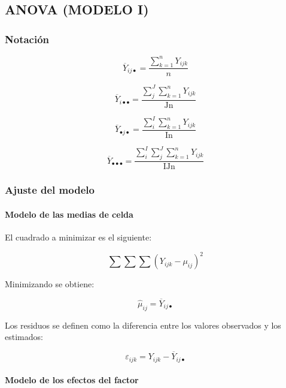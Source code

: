 \documentclass[]{book}
\let\oldparagraph\paragraph
\renewcommand{\paragraph}[1]{\oldparagraph{#1}\mbox{}}
\theoremstyle{definition}
\theoremstyle{definition}
\theoremstyle{definition}
\theoremstyle{remark}
\begin{document}
\hypertarget{anova-modelo-i}{%
\subsection{ANOVA (MODELO I)}\label{anova-modelo-i}}

\hypertarget{notacion}{%
\subsubsection{Notación}\label{notacion}}

\[
\overline{Y}_{ij \bullet} = \frac{\sum_{k = 1}^{n}Y_{ijk}}{n}
\]

\[
\overline{Y}_{i \bullet \bullet} = \frac{\sum_{j}^{J}{\sum_{k = 1}^{n}Y_{ijk}}}{\text{Jn}}
\]

\[
\overline{Y}_{\bullet j \bullet} = \frac{\sum_{i}^{I}{\sum_{k = 1}^{n}Y_{ijk}}}{\text{In}}
\]

\[
\overline{Y}_{\bullet \bullet \bullet} = \frac{\sum_{i}^{I}{\sum_{j}^{J}{\sum_{k = 1}^{n}Y_{ijk}}}}{\text{IJn}}
\]

\hypertarget{ajuste-del-modelo}{%
\subsubsection{Ajuste del modelo}\label{ajuste-del-modelo}}

\hypertarget{modelo-de-las-medias-de-celda}{%
\paragraph{Modelo de las medias de
celda}\label{modelo-de-las-medias-de-celda}}

El cuadrado a minimizar es el siguiente:

\[
\sum\sum\sum\left( Y_{ijk} - \mu_{ij} \right)^{2}
\]

Minimizando se obtiene:

\[
\hat{\mu}_{ij} = \overline{Y}_{ij \bullet}
\]

Los residuos se definen como la diferencia entre los valores observados
y los estimados:

\[
\varepsilon_{ijk} = Y_{ijk} - \overline{Y}_{ij \bullet}
\]

\hypertarget{modelo-de-los-efectos-del-factor}{%
\paragraph{Modelo de los efectos del
factor}\label{modelo-de-los-efectos-del-factor}}
\end{document}
